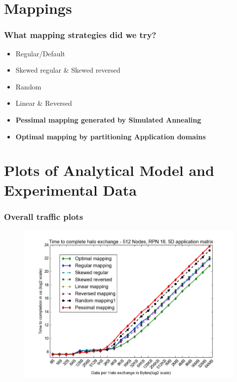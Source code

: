 \documentclass{beamer}
\begin{document}
\section{Mappings}
\begin{frame}
\frametitle{What mapping strategies did we try?}
\begin{itemize}
\item Regular/Default
\item Skewed regular \& Skewed reversed
\item Random
\item Linear \& Reversed
\item \textbf{Pessimal mapping generated by Simulated Annealing}
\item \textbf{Optimal mapping by partitioning Application domains}
\end{itemize}
\end{frame}


\section{Plots of Analytical Model and Experimental Data}

\begin{frame}
\frametitle{Overall traffic plots}
\begin{figure}
\includegraphics[width=0.8\linewidth]{../3D_512_all_mappings.png}
\end{figure}
\end{frame}
\end{document}
